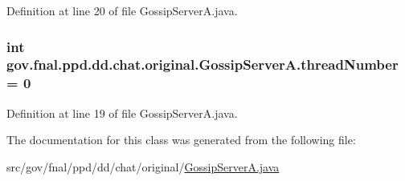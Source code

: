 Definition at line 20 of file Gossip\-Server\-A.\-java.

\hypertarget{classgov_1_1fnal_1_1ppd_1_1dd_1_1chat_1_1original_1_1GossipServerA_a4a676478d98fd09ff72e452da6eefc7f}{
\subsubsection[{thread\-Number}]{\setlength{\rightskip}{0pt plus 5cm}int gov.\-fnal.\-ppd.\-dd.\-chat.\-original.\-Gossip\-Server\-A.\-thread\-Number = 0\hspace{0.3cm}{\ttfamily [static]}}}\label{classgov_1_1fnal_1_1ppd_1_1dd_1_1chat_1_1original_1_1GossipServerA_a4a676478d98fd09ff72e452da6eefc7f}


Definition at line 19 of file Gossip\-Server\-A.\-java.



The documentation for this class was generated from the following file\-:\begin{DoxyCompactItemize}
\item 
src/gov/fnal/ppd/dd/chat/original/\hyperlink{GossipServerA_8java}{Gossip\-Server\-A.\-java}\end{DoxyCompactItemize}
